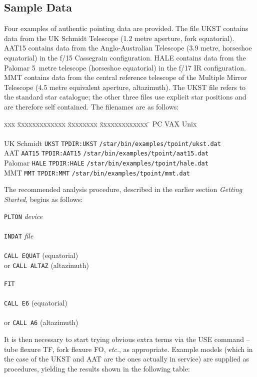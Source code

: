 \subsection{Sample Data}
Four examples of authentic pointing data are provided.  The file
UKST contains data from the UK Schmidt Telescope (1.2 metre aperture,
fork equatorial).  AAT15 contains data from the Anglo-Australian
Telescope (3.9 metre, horseshoe equatorial) in the f/15 Cassegrain
configuration.  HALE contains data from the Palomar 5~metre telescope
(horseshoe equatorial) in the f/17 IR configuration.  MMT contains
data from the central reference telescope of the Multiple Mirror
Telescope (4.5 metre equivalent aperture, altazimuth).  The UKST
file refers to the standard star catalogue;  the other three files
use explicit star positions and are therefore self contained.  The
filenames are as follows:
\begin{tabbing}
xxx \= xxxxxxxxxxxxx \= xxxxxxxx \= xxxxxxxxxxxxx \= \kill
\> \> PC \> VAX \> Unix \\ \\
\> UK Schmidt
\> {\tt UKST}
\> {\tt TPDIR:UKST}
\> {\tt /star/bin/examples/tpoint/ukst.dat} \\
\> AAT
\> {\tt AAT15}
\> {\tt TPDIR:AAT15}
\> {\tt /star/bin/examples/tpoint/aat15.dat} \\
\> Palomar
\> {\tt HALE}
\> {\tt TPDIR:HALE}
\> {\tt /star/bin/examples/tpoint/hale.dat} \\
\> MMT
\> {\tt MMT}
\> {\tt TPDIR:MMT}
\> {\tt /star/bin/examples/tpoint/mmt.dat}
\end{tabbing}

The recommended analysis procedure, described in the earlier section
{\it Getting Started}, begins as follows:
\begin{cmnds}
\> \> {\tt PLTON} {\it device} \\ \\
\> \> {\tt INDAT} {\it file} \\ \\
\> \> {\tt CALL EQUAT} \> (equatorial) \\
\> or \> {\tt CALL ALTAZ} \> (altazimuth) \\ \\
\> \> {\tt FIT} \\ \\
\> \> {\tt CALL E6} \> (equatorial) \\ \\
\> or \> {\tt CALL A6} \> (altazimuth)
\end{cmnds}
It is then necessary to start trying obvious extra terms via
the USE command -- tube flexure TF, fork flexure FO, {\it etc.}, as
appropriate.  Example models (which in the case of the UKST and AAT
are the ones actually in service) are supplied as procedures, yielding
the results shown in the following table:

